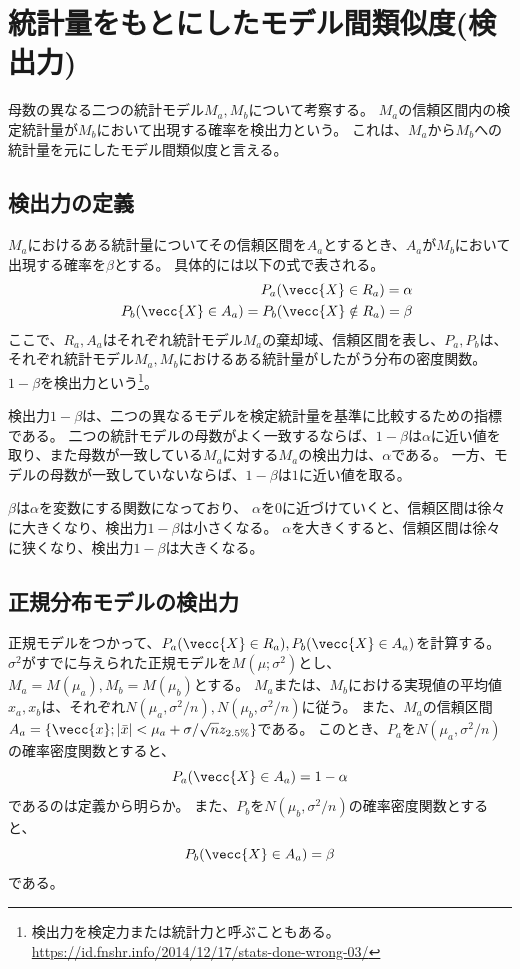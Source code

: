 \section{統計量をもとにしたモデル間類似度(検出力)}
母数の異なる二つの統計モデル$M_a,M_b$について考察する。
$M_a$の信頼区間内の検定統計量が$M_b$において出現する確率を検出力という。
これは、$M_a$から$M_b$への統計量を元にしたモデル間類似度と言える。

\subsection{検出力の定義}
$M_a$におけるある統計量についてその信頼区間を$A_a$とするとき、$A_a$が$M_b$において出現する確率を$\beta$とする。
具体的には以下の式で表される。
\begin{eqnarray*}
    & &P_a(\vecc{X} \in R_a) = \alpha\\
    & & P_b(\vecc{X} \in A_a) = P_b(\vecc{X} \notin R_a )=\beta
\end{eqnarray*}
ここで、$R_a,A_a$はそれぞれ統計モデル$M_a$の棄却域、信頼区間を表し、$P_a,P_b$は、それぞれ統計モデル$M_a,M_b$におけるある統計量がしたがう分布の密度関数。
$1-\beta$を検出力という\footnote{検出力を検定力または統計力と呼ぶこともある。\\ \url{https://id.fnshr.info/2014/12/17/stats-done-wrong-03/}}。


検出力$1-\beta$は、二つの異なるモデルを検定統計量を基準に比較するための指標である。
二つの統計モデルの母数がよく一致するならば、$1-\beta$は$\alpha$に近い値を取り、また母数が一致している$M_a$に対する$M_a$の検出力は、$\alpha$である。
一方、モデルの母数が一致していないならば、$1-\beta$は$1$に近い値を取る。

$\beta$は$\alpha$を変数にする関数になっており、
$\alpha$を0に近づけていくと、信頼区間は徐々に大きくなり、検出力$1-\beta$は小さくなる。
$\alpha$を大きくすると、信頼区間は徐々に狭くなり、検出力$1-\beta$は大きくなる。



\subsection{正規分布モデルの検出力}
正規モデルをつかって、$P_a(\vecc{X} \in R_a),P_b(\vecc{X} \in A_a)$を計算する。
$\sigma^2$がすでに与えられた正規モデルを$M(\mu;\sigma^2)$とし、$M_a=M(\mu_a),M_b=M(\mu_b)$とする。
$M_a$または、$M_b$における実現値の平均値$x_a,x_b$は、それぞれ$N(\mu_a,\sigma^2/n), N(\mu_b,\sigma^2/n)$に従う。
また、$M_a$の信頼区間$A_a=\{\vecc{x}; |\bar{x}| <\mu_a+\sigma / \sqrt{n}z_{2.5\%} \}$である。
このとき、$P_a$を$N(\mu_a,\sigma^2/n)$の確率密度関数とすると、
\begin{equation*}
    P_a(\vecc{X} \in A_a) = 1-\alpha
\end{equation*}
であるのは定義から明らか。
また、$P_b$を$N(\mu_b,\sigma^2/n)$の確率密度関数とすると、
\begin{equation*}
    P_b(\vecc{X} \in A_a ) = \beta
\end{equation*}
である。

